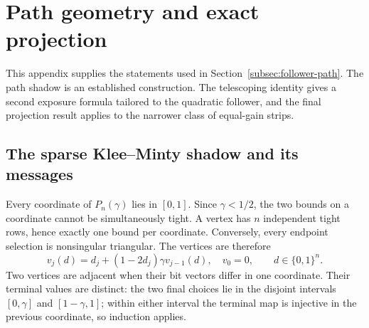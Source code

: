 \section{Path geometry and exact projection}\label{app:path-geometry}
This appendix supplies the statements used in Section~\ref{subsec:follower-path}.
The path shadow is an established construction. The telescoping identity gives
a second exposure formula tailored to the quadratic follower, and the final
projection result applies to the narrower class of equal-gain strips.

\subsection{The sparse Klee--Minty shadow and its messages}
\label{app:klee-shadow}
Every coordinate of \(P_n(\gamma)\) lies in \([0,1]\). Since \(\gamma<1/2\),
the two bounds on a coordinate cannot be simultaneously tight. A vertex has
\(n\) independent tight rows, hence exactly one bound per coordinate. Conversely,
every endpoint selection is nonsingular triangular. The vertices are therefore
\begin{equation}\label{eq:klee-vertices}
 v_j(d)=d_j+(1-2d_j)\gamma v_{j-1}(d),\quad v_0=0,
 \qquad d\in\{0,1\}^n.
\end{equation}
Two vertices are adjacent when their bit vectors differ in one coordinate.
Their terminal values are distinct: the two final choices lie in the disjoint
intervals \([0,\gamma]\) and \([1-\gamma,1]\); within either interval the
terminal map is injective in the previous coordinate, so induction applies.


